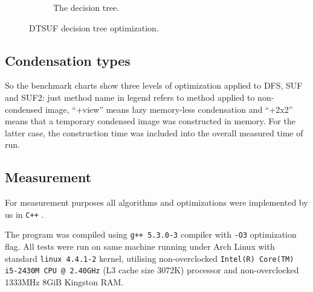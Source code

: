 \documentclass[hidelinks]{llncs}
\newcommand{\CXX}{\texttt{C++} \xspace}
\begin{document}
\begin{figure}
\begin{subfigure}{0.65\linewidth}
    \caption{The decision tree.}
  \end{subfigure}
  \caption{DTSUF decision tree optimization.}
  \label{fig:dtsuf}
\end{figure}

\subsection{Condensation types}


So the benchmark charts show three levels of optimization applied to DFS, SUF
and SUF2: just method name in legend refers to method applied to non-condensed
image, ``+view'' means lazy memory-less condensation and ``+2x2'' means that a
temporary condensed image was constructed in memory. For the latter case, the
construction time was included into the overall measured time of run.

\subsection{Measurement}

For measurement purposes all algorithms and optimizations were implemented by us in \CXX.

The program was compiled using \texttt{g++ 5.3.0-3} compiler with \texttt{-O3}
optimization flag. All tests were run on same machine running under Arch Linux
with standard \texttt{linux 4.4.1-2} kernel, utilising non-overclocked
\texttt{Intel(R) Core(TM) i5-2430M CPU @ 2.40GHz} (L3 cache size 3072K)
processor and non-overclocked 1333MHz 8GiB Kingston RAM.
\end{document}
